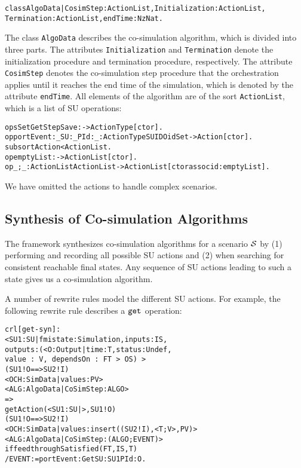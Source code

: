 \small
\begin{alltt}
class AlgoData | CosimStep : ActionList,   Initialization : ActionList, 
                 Termination : ActionList, endTime : NzNat .
\end{alltt}
\normalsize

The class \texttt{AlgoData} describes the co-simulation algorithm, which is divided into three parts.
The attributes \texttt{Initialization} and \texttt{Termination} denote the initialization procedure and termination procedure, respectively.
The attribute \texttt{CosimStep} denotes the co-simulation step procedure that the orchestration applies until it reaches the end time of the simulation, which is denoted by the attribute \texttt{endTime}.
All elements of the algorithm are of the sort \texttt{ActionList}, which is a list of SU operations:

\small
\begin{alltt}
ops Set Get Step Save : -> ActionType [ctor] . 
op portEvent:_SU:_PId:_ : ActionType SUID OidSet -> Action [ctor] .
subsort Action < ActionList .
op emptyList : -> ActionList [ctor] .
op _;_ : ActionList ActionList -> ActionList [ctor assoc id: emptyList] .
\end{alltt}
\normalsize

\noindent We have omitted the actions to handle complex scenarios.


\subsection{Synthesis of Co-simulation Algorithms}
The framework synthesizes co-simulation algorithms for a scenario $\mathcal{S}$ by (1) performing and recording all possible SU actions and (2) when searching for consistent reachable final states.
Any sequence of SU actions leading to such a state gives us a co-simulation algorithm.

A number of rewrite rules model the different SU actions.
For example, the following rewrite rule describes a $\mathtt{get}_{}$ operation:
\small
\begin{alltt}
crl [get-syn] :
    < SU1 : SU | fmistate : Simulation, inputs : IS, 
                  outputs : (< O : Output | time : T, status : Undef, 
                                            value\,:\,V,\,dependsOn\,:\,FT\,>\,OS)\,> 
    (SU1 ! O ==> SU2 ! I)
    < OCH : SimData | values : PV > 
    < ALG : AlgoData | CoSimStep : ALGO >
    => 
    getAction(< SU1 : SU | >, SU1 ! O)
    (SU1 ! O ==> SU2 ! I)
    < OCH : SimData | values : insert((SU2 ! I), < T ; V >, PV) >  
    < ALG : AlgoData | CoSimStep : (ALGO ; EVENT) >
  if feedthroughSatisfied(FT, IS, T) 
    / EVENT := portEvent: Get SU: SU1 PId: O . 
\end{alltt}
\normalsize

